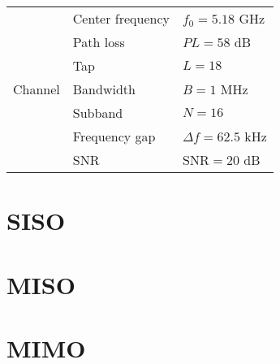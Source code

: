 \begin{table}[h!]
\begin{tabular}{lll}
\multirow{7}{*}{Channel}        & Center frequency                   & ${f_0} = 5.18$ GHz                   \\
                              & Path loss                          & $PL = 58$ dB                         \\
                              & Tap                                & $L = 18$                             \\
                              & Bandwidth                          & $B = 1$ MHz                          \\
                              & Subband                            & $N = 16$                             \\
                              & Frequency gap                      & $\Delta f = 62.5$ kHz                \\
                              & SNR                                & $\text{SNR} = 20$ dB
\end{tabular}
\label{tab:reference_parameters}
\end{table}

\section{SISO}\label{sec:siso}
  

\section{MISO}\label{sec:miso}
  

\section{MIMO}\label{sec:mimo}
   